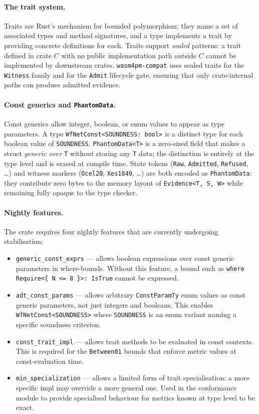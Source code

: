 \paragraph{The trait system.}
Traits are Rust's mechanism for bounded polymorphism: they name a set of
associated types and method signatures, and a type implements a trait by
providing concrete definitions for each. Traits support \emph{sealed} patterns:
a trait defined in crate $C$ with no public implementation path outside $C$
cannot be implemented by downstream crates. \texttt{wasm4pm-compat} uses sealed
traits for the \texttt{Witness} family and for the \texttt{Admit} lifecycle
gate, ensuring that only crate-internal paths can produce admitted evidence.

\paragraph{Const generics and \texttt{PhantomData}.}
Const generics allow integer, boolean, or enum values to appear as type
parameters. A type \texttt{WfNetConst<SOUNDNESS: bool>} is a distinct type for
each boolean value of \texttt{SOUNDNESS}. \texttt{PhantomData<T>} is a
zero-sized field that makes a struct \emph{generic over} \texttt{T} without
storing any \texttt{T} data; the distinction is entirely at the type level and
is erased at compile time. State tokens (\texttt{Raw}, \texttt{Admitted},
\texttt{Refused}, \ldots) and witness markers (\texttt{Ocel20},
\texttt{Xes1849}, \ldots) are both encoded as \texttt{PhantomData}: they
contribute zero bytes to the memory layout of \texttt{Evidence<T, S, W>}
while remaining fully opaque to the type checker.

\paragraph{Nightly features.}
The crate requires four nightly features that are currently undergoing
stabilisation:

\begin{itemize}
  \item \texttt{generic\_const\_exprs} --- allows boolean expressions over const
        generic parameters in where-bounds. Without this feature, a bound such
        as \texttt{where Require<\{ N <= 8 \}>: IsTrue} cannot be expressed.
  \item \texttt{adt\_const\_params} --- allows arbitrary \texttt{ConstParamTy}
        enum values as const generic parameters, not just integers and booleans.
        This enables \texttt{WfNetConst<SOUNDNESS>} where \texttt{SOUNDNESS} is
        an enum variant naming a specific soundness criterion.
  \item \texttt{const\_trait\_impl} --- allows trait methods to be evaluated in
        const contexts. This is required for the \texttt{Between01} bounds that
        enforce metric values at const-evaluation time.
  \item \texttt{min\_specialization} --- allows a limited form of trait
        specialisation: a more specific impl may override a more general one.
        Used in the conformance module to provide specialised behaviour for
        metrics known at type level to be exact.
\end{itemize}

